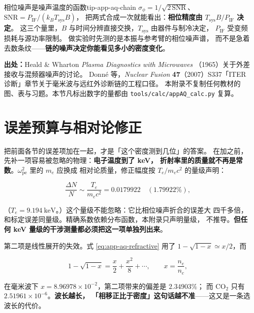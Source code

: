 \begin{tip}{相位噪声是噪声温度的函数}{tip-app-aq-chain}
$\sigma_\phi = 1/\sqrt{2\,\mathrm{SNR}}$、$\mathrm{SNR} = P_{\mathrm{IF}}/(k_BT_{\mathrm{sys}}B)$，
把两式合成一次就能看出：\textbf{相位精度由 $T_{\mathrm{sys}}B/P_{\mathrm{IF}}$ 决定}。
这三个量里，$B$ 与时间分辨直接交换，$T_{\mathrm{sys}}$ 由器件与制冷决定，
$P_{\mathrm{IF}}$ 受变频损耗与源功率限制。
做实验时先测的是本振与参考臂的相位噪声谱，
而不是急着去数条纹——\textbf{链的噪声决定你能看见多小的密度变化}。
\end{tip}

{\footnotesize
\textbf{出处：}Heald \& Wharton \textit{Plasma Diagnostics with Microwaves}
（1965）关于外差接收与混频器噪声的讨论。
Donné 等，\textit{Nuclear Fusion}
\textbf{47}（2007）S337「ITER 诊断」章节关于毫米波与远红外诊断链的工程口径。
本附录不复制任何教材的图、表与习题。本节凡标出数字的量都由
\texttt{tools/\allowbreak{}calc/\allowbreak{}appAQ\_calc.py} 复算。
}

\section{误差预算与相对论修正}
\label{sec:app-aq-error}

把前面各节的误差项加在一起，才是「这个密度测到几位」的答案。
在加之前，先补一项容易被忽略的物理：\textbf{电子温度到了 keV，
折射率里的质量就不再是常数}。$\omega_{\mathrm{pe}}^2$ 里的 $m_e$ 应换成
相对论质量，修正幅度按 $T_e/m_ec^2$ 的量级声明：

\begin{equation}
\frac{\Delta N}{N} \sim \frac{T_e}{m_ec^2} = 0.0179922 \quad (1.79922\%),
\label{eq:app-aq-relativistic}
\end{equation}

（$T_e = 9.194\ \mathrm{keV}$。）这个量级不能忽略：它比相位噪声折合的误差大
四千多倍，和标定误差同量级。精确系数依赖分布函数，本附录只声明量级，
不推导。\textbf{但任何 keV 量级的干涉测量都必须把这一项单独列出来}。

第二项是线性展开的失效。式 \eqref{eq:app-aq-refractive} 用了
$1-\sqrt{1-x}\simeq x/2$，而

\begin{equation}
1-\sqrt{1-x} = \frac{x}{2} + \frac{x^2}{8} + \cdots,
\qquad x = \frac{n_e}{n_c},
\label{eq:app-aq-expansion}
\end{equation}

在毫米波下 $x = 8.96978\times10^{-2}$，第二项带来的偏差是 $2.34903\%$；
而 CO$_2$ 只有 $2.51961\times10^{-6}$。\textbf{波长越长，
「相移正比于密度」这句话越不准}——这又是一条选波长的代价。

